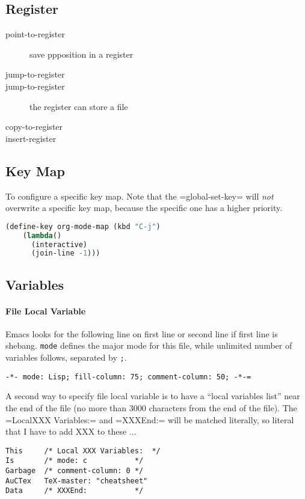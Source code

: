 \subsection{Register}
\begin{description}
\item [point-to-register] save ppposition in a register
\item [jump-to-register]
\item [jump-to-register] the register can store a file
\item [copy-to-register]
\item [insert-register]
\end{description}


\subsection{Key Map}
To configure a specific key map.  Note that the =global-set-key= will
\textit{not} overwrite a specific key map, because the specific one has a
higher priority.

\begin{lstlisting}[language=lisp]
  (define-key org-mode-map (kbd "C-j")
    (lambda()
      (interactive)
      (join-line -1)))
\end{lstlisting}

\subsection{Variables}
\paragraph{File Local Variable}
Emacs looks for the following line on first line or second line if
first line is shebang. \texttt{mode} defines the major mode for this
file, while unlimited number of variables follows, separated by
\texttt{;}.

\begin{lstlisting}
-*- mode: Lisp; fill-column: 75; comment-column: 50; -*-=
\end{lstlisting}


A second way to specify file local variable is to have a ``local
variables list'' near the end of the file (no more than 3000
characters from the end of the file).  The =LocalXXX Variables:= and
=XXXEnd:= will be matched literally, so literal that I have to add XXX
to these $\ldots$
\begin{lstlisting}
This     /* Local XXX Variables:  */
Is       /* mode: c           */
Garbage  /* comment-column: 0 */
AuCTex   TeX-master: "cheatsheet"
Data     /* XXXEnd:           */
\end{lstlisting}

